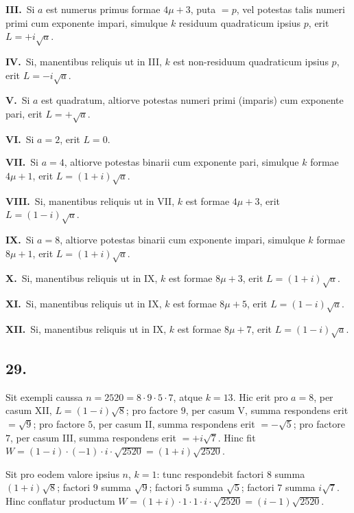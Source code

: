 \documentclass[12pt,a4paper]{article}
\theoremstyle{plain}
\begin{document}
\medskip
\noindent\textbf{III.}\ Si $a$ est numerus primus formae $4\mu+3$, puta $= p$, vel potestas talis numeri primi cum exponente impari, simulque $k$ residuum quadraticum ipsius $p$, erit $L = +i\sqrt{a}$.

\medskip
\noindent\textbf{IV.}\ Si, manentibus reliquis ut in III, $k$ est non-residuum quadraticum ipsius $p$, erit $L = -i\sqrt{a}$.

\medskip
\noindent\textbf{V.}\ Si $a$ est quadratum, altiorve potestas numeri primi (imparis) cum exponente pari, erit $L = +\sqrt{a}$.

\medskip
\noindent\textbf{VI.}\ Si $a = 2$, erit $L = 0$.

\medskip
\noindent\textbf{VII.}\ Si $a = 4$, altiorve potestas binarii cum exponente pari, simulque $k$ formae $4\mu+1$, erit $L = (1+i)\sqrt{a}$.

\medskip
\noindent\textbf{VIII.}\ Si, manentibus reliquis ut in VII, $k$ est formae $4\mu+3$, erit $L = (1-i)\sqrt{a}$.

\medskip
\noindent\textbf{IX.}\ Si $a = 8$, altiorve potestas binarii cum exponente impari, simulque $k$ formae $8\mu+1$, erit $L = (1+i)\sqrt{a}$.

\medskip
\noindent\textbf{X.}\ Si, manentibus reliquis ut in IX, $k$ est formae $8\mu+3$, erit $L = (1+i)\sqrt{a}$.

\medskip
\noindent\textbf{XI.}\ Si, manentibus reliquis ut in IX, $k$ est formae $8\mu+5$, erit $L = (1-i)\sqrt{a}$.

\medskip
\noindent\textbf{XII.}\ Si, manentibus reliquis ut in IX, $k$ est formae $8\mu+7$, erit $L = (1-i)\sqrt{a}$.

\subsection*{29.}

Sit exempli caussa $n = 2520 = 8 \cdot 9 \cdot 5 \cdot 7$, atque $k = 13$. Hic erit pro $a = 8$, per casum XII, $L = (1-i)\sqrt{8}$; pro factore $9$, per casum V, summa respondens erit $= \sqrt{9}$; pro factore $5$, per casum II, summa respondens erit $= -\sqrt{5}$; pro factore $7$, per casum III, summa respondens erit $= +i\sqrt{7}$. Hinc fit $W = (1-i) \cdot (-1) \cdot i \cdot \sqrt{2520} = (1+i)\sqrt{2520}$.

Sit pro eodem valore ipsius $n$, $k = 1$: tunc respondebit factori $8$ summa $(1+i)\sqrt{8}$; factori $9$ summa $\sqrt{9}$; factori $5$ summa $\sqrt{5}$; factori $7$ summa $i\sqrt{7}$. Hinc conflatur productum $W = (1+i) \cdot 1 \cdot 1 \cdot i \cdot \sqrt{2520} = (i-1)\sqrt{2520}$.
\end{document}
